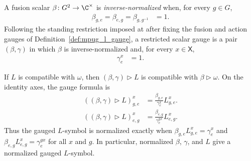 \begin{definition}
    \label{def:mpug_restricted_scalar_gauge}
    \leanok
    A fusion scalar $\beta\colon G^2\to\C^\times$ is
    \emph{inverse-normalized} when, for every $g\in G$,
    \begin{align}
        \beta_{g,e}=\beta_{e,g}=\beta_{g,g^{-1}}
         & =1.
        \label{eq:mpug_restricted_fusion_gauge}
    \end{align}
    Following the standing restriction imposed at
    \cite[lines~2050--2054]{FrancoRubio2025MPUGauging} after fixing the
    fusion and action gauges of Definition~\ref{def:mpug_l_gauge}, a
    restricted scalar gauge is a pair $(\beta,\gamma)$ in which $\beta$ is
    inverse-normalized and, for every $x\in\mathsf X$,
    \begin{align}
        \gamma^x_e & =1.
        \label{eq:mpug_restricted_action_gauge}
    \end{align}
\end{definition}

\begin{lemma}
    \label{thm:mpug_l_gauge_preservation}
    \leanok
    If $L$ is compatible with $\omega$, then
    $(\beta,\gamma)\mathbin{\triangleright}L$ is compatible with
    $\beta\mathbin{\triangleright}\omega$. On the identity axes, the gauge
    formula is
    \begin{align}
        ((\beta,\gamma)\mathbin{\triangleright}L)^x_{g,e}
         & =\frac{\beta_{g,e}}{\gamma^x_e}L^x_{g,e}.
        \label{eq:mpug_l_gauge_right}
    \end{align}
    \begin{align}
        ((\beta,\gamma)\mathbin{\triangleright}L)^x_{e,g}
         & =\frac{\beta_{e,g}}{\gamma^{g x}_e}L^x_{e,g}.
        \label{eq:mpug_l_gauge_left}
    \end{align}
    Thus the gauged $L$-symbol is normalized exactly when
    $\beta_{g,e}L^x_{g,e}=\gamma^x_e$ and
    $\beta_{e,g}L^x_{e,g}=\gamma^{g x}_e$ for all $x$ and $g$. In particular,
    normalized $\beta$, $\gamma$, and $L$ give a normalized gauged $L$-symbol.
\end{lemma}

